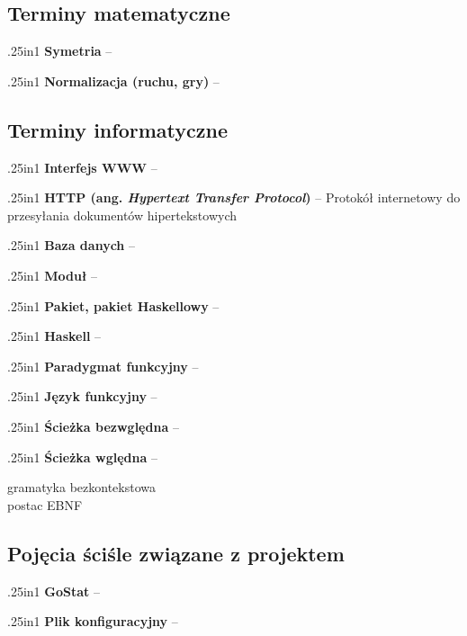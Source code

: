 \documentclass[12pt,leqno]{article}
\newcommand{\entry}[2]{
 \begin{hangparas}{.25in}{1}
  \noindent \textbf{#1} -- #2 \\
 \end{hangparas}
}
\begin{document}
\subsection{Terminy matematyczne}

\entry{Symetria}{}

\entry{Normalizacja (ruchu, gry)}{}

\subsection{Terminy informatyczne}

\entry{Interfejs WWW}{}

\entry{HTTP (ang. \emph{Hypertext Transfer Protocol})}{Protokół internetowy do przesyłania dokumentów hipertekstowych}

\entry{Baza danych}{}

\entry{Moduł}{}

\entry{Pakiet, pakiet Haskellowy}{}

\entry{Haskell}{}

\entry{Paradygmat funkcyjny}{}

\entry{Język funkcyjny}{}

\entry{Ścieżka bezwględna}{}

\entry{Ścieżka wględna}{}

gramatyka bezkontekstowa \\
postac EBNF \\ 

\subsection{Pojęcia ściśle związane z projektem}

\entry{GoStat}{}

\entry{Plik konfiguracyjny}{}
\end{document}
